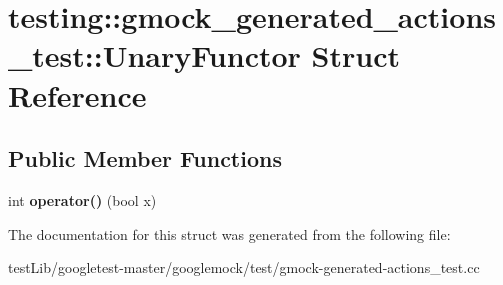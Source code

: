 \hypertarget{structtesting_1_1gmock__generated__actions__test_1_1UnaryFunctor}{}\section{testing\+:\+:gmock\+\_\+generated\+\_\+actions\+\_\+test\+:\+:Unary\+Functor Struct Reference}
\label{structtesting_1_1gmock__generated__actions__test_1_1UnaryFunctor}
\subsection*{Public Member Functions}
\begin{DoxyCompactItemize}
\item 
\mbox{\label{structtesting_1_1gmock__generated__actions__test_1_1UnaryFunctor_aeae4c0025faeac92845d652b35ac2846}} 
int {\bfseries operator()} (bool x)
\end{DoxyCompactItemize}


The documentation for this struct was generated from the following file\+:\begin{DoxyCompactItemize}
\item 
test\+Lib/googletest-\/master/googlemock/test/gmock-\/generated-\/actions\+\_\+test.\+cc\end{DoxyCompactItemize}
